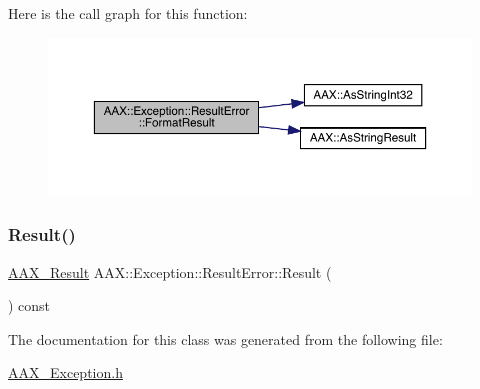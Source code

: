 Here is the call graph for this function\+:
\nopagebreak
\begin{figure}[H]
\begin{center}
\leavevmode
\includegraphics[width=350pt]{a01597_a55c2ce6a7122bee29558dc16bd860067_cgraph}
\end{center}
\end{figure}
\mbox{\label{a01597_ad7773300e7e3920726ad6ffe508d3547}} 
\subsubsection{\texorpdfstring{Result()}{Result()}}
{\footnotesize\ttfamily \mbox{\hyperlink{a00392_a4d8f69a697df7f70c3a8e9b8ee130d2f}{A\+A\+X\+\_\+\+Result}} A\+A\+X\+::\+Exception\+::\+Result\+Error\+::\+Result (\begin{DoxyParamCaption}{ }\end{DoxyParamCaption}) const\hspace{0.3cm}{\ttfamily [inline]}}



The documentation for this class was generated from the following file\+:\begin{DoxyCompactItemize}
\item 
\mbox{\hyperlink{a00497}{A\+A\+X\+\_\+\+Exception.\+h}}\end{DoxyCompactItemize}
